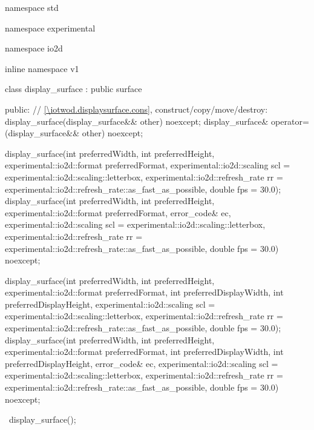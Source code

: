 \begin{codeblock}
namespace std { namespace experimental { namespace io2d { inline namespace v1 {
  class display_surface : public surface {
  public:
    // \ref{\iotwod.displaysurface.cons}, construct/copy/move/destroy:
    display_surface(display_surface&& other) noexcept;
    display_surface& operator=(display_surface&& other) noexcept;
    
    display_surface(int preferredWidth, int preferredHeight, 
      experimental::io2d::format preferredFormat,
      experimental::io2d::scaling scl = experimental::io2d::scaling::letterbox,
      experimental::io2d::refresh_rate rr =
      experimental::io2d::refresh_rate::as_fast_as_possible, double fps = 30.0);
    display_surface(int preferredWidth, int preferredHeight, 
      experimental::io2d::format preferredFormat, error_code& ec,
      experimental::io2d::scaling scl = experimental::io2d::scaling::letterbox,
      experimental::io2d::refresh_rate rr =
      experimental::io2d::refresh_rate::as_fast_as_possible, double fps = 30.0) 
      noexcept;
    
    display_surface(int preferredWidth, int preferredHeight, 
      experimental::io2d::format preferredFormat,
      int preferredDisplayWidth, int preferredDisplayHeight,
      experimental::io2d::scaling scl = experimental::io2d::scaling::letterbox,
      experimental::io2d::refresh_rate rr =
      experimental::io2d::refresh_rate::as_fast_as_possible, double fps = 30.0);
    display_surface(int preferredWidth, int preferredHeight, 
      experimental::io2d::format preferredFormat,
      int preferredDisplayWidth, int preferredDisplayHeight, error_code& ec,
      experimental::io2d::scaling scl = experimental::io2d::scaling::letterbox,
      experimental::io2d::refresh_rate rr =
      experimental::io2d::refresh_rate::as_fast_as_possible, double fps = 30.0) 
      noexcept;
    
    ~display_surface();
    
}}}}}
\end{codeblock}
